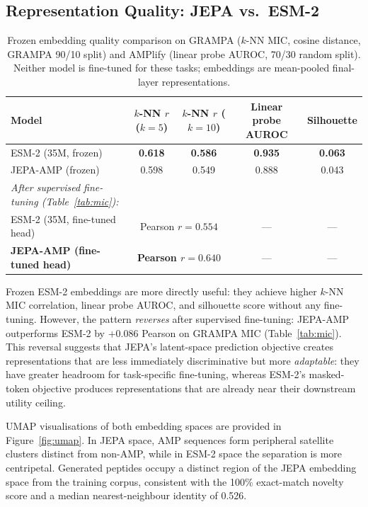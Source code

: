 \subsection{Representation Quality: JEPA vs.\ ESM-2}
\label{sec:res_emb}

\begin{table}[h]
\centering
\caption{Frozen embedding quality comparison on GRAMPA ($k$-NN MIC,
  cosine distance, GRAMPA 90/10 split) and AMPlify (linear probe AUROC,
  70/30 random split).
  Neither model is fine-tuned for these tasks; embeddings are mean-pooled
  final-layer representations.}
\label{tab:emb_quality}
\begin{tabular}{lcccc}
\toprule
\textbf{Model} & \textbf{$k$-NN $r$ ($k{=}5$)} & \textbf{$k$-NN $r$ ($k{=}10$)} & \textbf{Linear probe AUROC} & \textbf{Silhouette} \\
\midrule
ESM-2 (35M, frozen) & \textbf{0.618} & \textbf{0.586} & \textbf{0.935} & \textbf{0.063} \\
JEPA-AMP (frozen)   & 0.598          & 0.549          & 0.888          & 0.043          \\
\midrule
\textit{After supervised fine-tuning (Table~\ref{tab:mic}):} & & & & \\
ESM-2 (35M, fine-tuned head) & \multicolumn{2}{c}{Pearson $r = 0.554$} & --- & --- \\
\textbf{JEPA-AMP (fine-tuned head)} & \multicolumn{2}{c}{\textbf{Pearson $r = 0.640$}} & --- & --- \\
\bottomrule
\end{tabular}
\end{table}

Frozen ESM-2 embeddings are more directly useful: they achieve higher $k$-NN
MIC correlation, linear probe AUROC, and silhouette score without any
fine-tuning.
However, the pattern \emph{reverses} after supervised fine-tuning: JEPA-AMP
outperforms ESM-2 by $+0.086$ Pearson on GRAMPA MIC (Table~\ref{tab:mic}).
This reversal suggests that JEPA's latent-space prediction objective creates
representations that are less immediately discriminative but more
\emph{adaptable}: they have greater headroom for task-specific fine-tuning,
whereas ESM-2's masked-token objective produces representations that are
already near their downstream utility ceiling.

UMAP visualisations of both embedding spaces are provided in
Figure~\ref{fig:umap}.
In JEPA space, AMP sequences form peripheral satellite clusters distinct from
non-AMP, while in ESM-2 space the separation is more centripetal.
Generated peptides occupy a distinct region of the JEPA embedding space
from the training corpus, consistent with the 100\% exact-match novelty score
and a median nearest-neighbour identity of 0.526.

